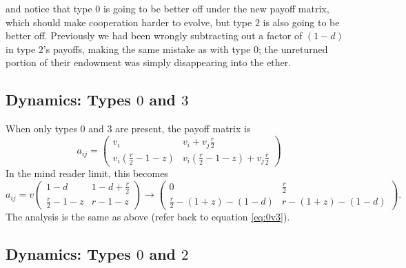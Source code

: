 \documentclass[13pt]{amsart}
\begin{document}
and notice that type $0$ is going to be better off under the new payoff matrix, which should make cooperation harder to evolve, but type $2$ is also going to be better off.
Previously we had been wrongly subtracting out a factor of $(1-d)$ in type $2$'s payoffs, making the same mistake as with type $0$; the unreturned portion of their endowment was simply disappearing into the ether.

\subsection*{Dynamics: Types $0$ and $3$}

When only types $0$ and $3$ are present, the payoff matrix is
\begin{equation}
    a_{ij} =
    \begin{pmatrix}
        v_i & v_i + v_j\frac{r}{2} \\
        v_i(\frac{r}{2} - 1 - z) & v_i(\frac{r}{2} - 1 - z) + v_j\frac{r}{2}
    \end{pmatrix}
\end{equation}
In the mind reader limit, this becomes
\begin{equation}
    a_{ij} = v
    \begin{pmatrix}
        1-d & 1-d + \frac{r}{2} \\
        \frac{r}{2} - 1 - z & r - 1 - z
    \end{pmatrix}
    \to
    \begin{pmatrix}
        0 & \frac{r}{2} \\
        \frac{r}{2} - (1+z) - (1-d) & r - (1+z) - (1-d)
    \end{pmatrix}.
\end{equation}
The analysis is the same as above (refer back to equation \ref{eq:0v3}).

\subsection*{Dynamics: Types $0$ and $2$}
\end{document}
